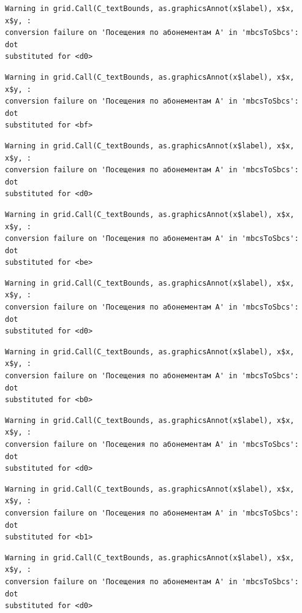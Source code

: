 \documentclass[
  letterpaper,
  DIV=11,
  numbers=noendperiod]{scrartcl}
\begin{document}
\begin{verbatim}
Warning in grid.Call(C_textBounds, as.graphicsAnnot(x$label), x$x, x$y, :
conversion failure on 'Посещения по абонементам А' in 'mbcsToSbcs': dot
substituted for <d0>
\end{verbatim}

\begin{verbatim}
Warning in grid.Call(C_textBounds, as.graphicsAnnot(x$label), x$x, x$y, :
conversion failure on 'Посещения по абонементам А' in 'mbcsToSbcs': dot
substituted for <bf>
\end{verbatim}

\begin{verbatim}
Warning in grid.Call(C_textBounds, as.graphicsAnnot(x$label), x$x, x$y, :
conversion failure on 'Посещения по абонементам А' in 'mbcsToSbcs': dot
substituted for <d0>
\end{verbatim}

\begin{verbatim}
Warning in grid.Call(C_textBounds, as.graphicsAnnot(x$label), x$x, x$y, :
conversion failure on 'Посещения по абонементам А' in 'mbcsToSbcs': dot
substituted for <be>
\end{verbatim}

\begin{verbatim}
Warning in grid.Call(C_textBounds, as.graphicsAnnot(x$label), x$x, x$y, :
conversion failure on 'Посещения по абонементам А' in 'mbcsToSbcs': dot
substituted for <d0>
\end{verbatim}

\begin{verbatim}
Warning in grid.Call(C_textBounds, as.graphicsAnnot(x$label), x$x, x$y, :
conversion failure on 'Посещения по абонементам А' in 'mbcsToSbcs': dot
substituted for <b0>
\end{verbatim}

\begin{verbatim}
Warning in grid.Call(C_textBounds, as.graphicsAnnot(x$label), x$x, x$y, :
conversion failure on 'Посещения по абонементам А' in 'mbcsToSbcs': dot
substituted for <d0>
\end{verbatim}

\begin{verbatim}
Warning in grid.Call(C_textBounds, as.graphicsAnnot(x$label), x$x, x$y, :
conversion failure on 'Посещения по абонементам А' in 'mbcsToSbcs': dot
substituted for <b1>
\end{verbatim}

\begin{verbatim}
Warning in grid.Call(C_textBounds, as.graphicsAnnot(x$label), x$x, x$y, :
conversion failure on 'Посещения по абонементам А' in 'mbcsToSbcs': dot
substituted for <d0>
\end{verbatim}
\end{document}
